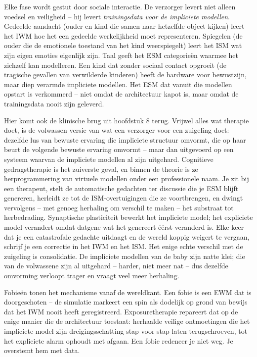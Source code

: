 \documentclass[11pt, twoside, openright]{book}
\begin{document}
Elke fase wordt gestut door sociale interactie. De verzorger levert niet alleen voedsel en veiligheid -- hij levert \textit{trainingsdata voor de impliciete modellen}. Gedeelde aandacht (ouder en kind die samen naar hetzelfde object kijken) leert het IWM hoe het een gedeelde werkelijkheid moet representeren. Spiegelen (de ouder die de emotionele toestand van het kind weerspiegelt) leert het ISM wat zijn eigen emoties eigenlijk zijn. Taal geeft het ESM categorieën waarmee het zichzelf kan modelleren. Een kind dat zonder sociaal contact opgroeit (de tragische gevallen van verwilderde kinderen) heeft de hardware voor bewustzijn, maar diep verarmde impliciete modellen. Het ESM dat vanuit die modellen opstart is verkommerd -- niet omdat de architectuur kapot is, maar omdat de trainingsdata nooit zijn geleverd.

Hier komt ook de klinische brug uit hoofdstuk 8 terug. Vrijwel alles wat therapie doet, is de volwassen versie van wat een verzorger voor een zuigeling doet: dezelfde lus van bewuste ervaring die impliciete structuur omvormt, die op haar beurt de volgende bewuste ervaring omvormt -- maar dan uitgevoerd op een systeem waarvan de impliciete modellen al zijn uitgehard. Cognitieve gedragstherapie is het zuiverste geval, en binnen de theorie is ze herprogrammering van virtuele modellen onder een professionele naam. Je zit bij een therapeut, stelt de automatische gedachten ter discussie die je ESM blijft genereren, herleidt ze tot de ISM-overtuigingen die ze voortbrengen, en dwingt vervolgens -- met genoeg herhaling om verschil te maken -- het substraat tot herbedrading. Synaptische plasticiteit bewerkt het impliciete model; het expliciete model verandert omdat datgene wat het genereert éérst veranderd is. Elke keer dat je een catastrofale gedachte uitdaagt en de wereld koppig weigert te vergaan, schrijf je een correctie in het IWM en het ISM. Het enige echte verschil met de zuigeling is consolidatie. De impliciete modellen van de baby zijn natte klei; die van de volwassene zijn al uitgehard -- harder, niet meer nat -- dus dezelfde omvorming verloopt trager en vraagt veel meer herhaling.

Fobieën tonen het mechanisme vanaf de wereldkant. Een fobie is een EWM dat is doorgeschoten -- de simulatie markeert een spin als dodelijk op grond van bewijs dat het IWM nooit heeft geregistreerd. Exposuretherapie repareert dat op de enige manier die de architectuur toestaat: herhaalde veilige ontmoetingen die het impliciete model zijn dreigingsschatting stap voor stap laten terugschroeven, tot het expliciete alarm ophoudt met afgaan. Een fobie redeneer je niet weg. Je overstemt hem met data.
\end{document}
